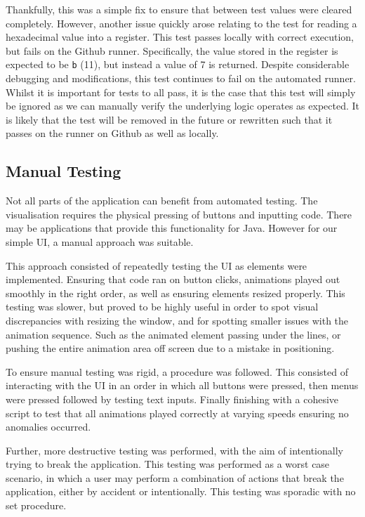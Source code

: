 Thankfully, this was a simple fix to ensure that between test values were cleared completely. However, another issue quickly arose relating to the test for reading a hexadecimal value into a register. This test passes locally with correct execution, but fails on the Github runner. Specifically, the value stored in the register is expected to be \texttt{b} (11), but instead a value of 7 is returned. Despite considerable debugging and modifications, this test continues to fail on the automated runner. Whilst it is important for tests to all pass, it is the case that this test will simply be ignored as we can manually verify the underlying logic operates as expected. It is likely that the test will be removed in the future or rewritten such that it passes on the runner on Github as well as locally.

\subsection{Manual Testing}
Not all parts of the application can benefit from automated testing. The visualisation requires the physical pressing of buttons and inputting code. There may be applications that provide this functionality for Java. However for our simple \ac{UI}, a manual approach was suitable.

This approach consisted of repeatedly testing the \ac{UI} as elements were implemented. Ensuring that code ran on button clicks, animations played out smoothly in the right order, as well as ensuring elements resized properly. This testing was slower, but proved to be highly useful in order to spot visual discrepancies with resizing the window, and for spotting smaller issues with the animation sequence. Such as the animated element passing under the lines, or pushing the entire animation area off screen due to a mistake in positioning.

To ensure manual testing was rigid, a procedure was followed. This consisted of interacting with the \ac{UI} in an order in which all buttons were pressed, then menus were pressed followed by testing text inputs. Finally finishing with a cohesive script to test that all animations played correctly at varying speeds ensuring no anomalies occurred.

Further, more destructive testing was performed, with the aim of intentionally trying to break the application. This testing was performed as a worst case scenario, in which a user may perform a combination of actions that break the application, either by accident or intentionally. This testing was sporadic with no set procedure. 

